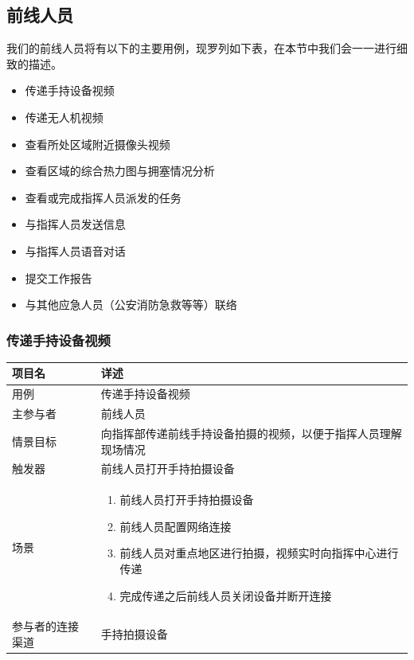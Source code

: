 \documentclass{ctexrep}
\begin{document}
\subsection{前线人员}
我们的前线人员将有以下的主要用例，现罗列如下表，在本节中我们会一一进行细致的描述。
\begin{itemize}
\item 传递手持设备视频
\item 传递无人机视频
\item 查看所处区域附近摄像头视频
\item 查看区域的综合热力图与拥塞情况分析
\item 查看或完成指挥人员派发的任务
\item 与指挥人员发送信息
\item 与指挥人员语音对话
\item 提交工作报告
\item 与其他应急人员（公安消防急救等等）联络
\end{itemize}
\subsubsection{传递手持设备视频}
\begin{longtable}{p{2cm} | p{10cm}}
\hline
项目名 & 详述 \\
\hline
\hline
用例 & 传递手持设备视频 \\
\hline
主参与者 & 前线人员  \\
\hline
情景目标 & 向指挥部传递前线手持设备拍摄的视频，以便于指挥人员理解现场情况 \\
\hline
触发器 & 前线人员打开手持拍摄设备 \\
\hline
场景 & \begin{enumerate}
	\item 前线人员打开手持拍摄设备
	\item 前线人员配置网络连接
	\item 前线人员对重点地区进行拍摄，视频实时向指挥中心进行传递
	\item 完成传递之后前线人员关闭设备并断开连接
\end{enumerate} \\
\hline
参与者的连接渠道 & 手持拍摄设备 \\
\hline
\end{longtable}
\end{document}
